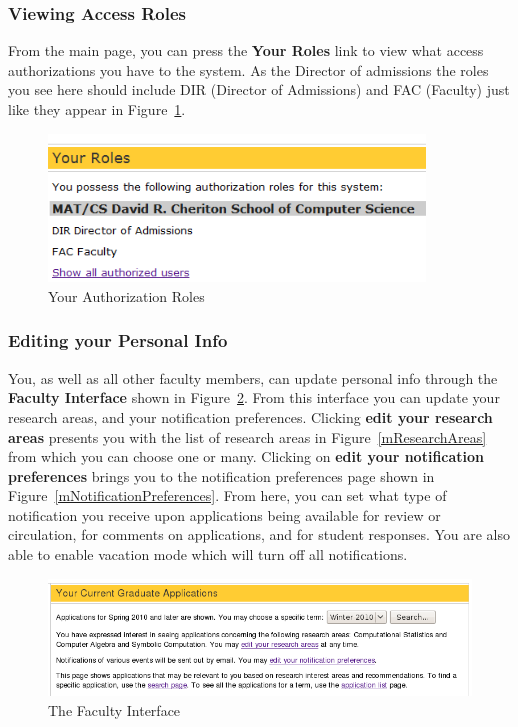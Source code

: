 \documentclass[titlepage]{article}
\begin{document}
\subsubsection{Viewing Access Roles}
From the main page, you can press the \textbf{\textsf{Your Roles}} link to view what
access authorizations you have to the system.  As the Director of admissions
the roles you see here should include DIR (Director of Admissions) and FAC
(Faculty) just like they appear in Figure~\ref{mYourRoles}.

\begin{figure}[h!]
  \begin{center}
  \includegraphics[width=10cm]{yourroles.png}
  \end{center}
  \caption{Your Authorization Roles}
  \label{mYourRoles}
\end{figure}

\subsubsection{Editing your Personal Info}
You, as well as all other faculty members, can update personal info through
the \textbf{\textsf{Faculty Interface}} shown in Figure~\ref{mFacultyInterface}.  From
this interface you can update your research areas, and your notification
preferences.  Clicking \textbf{\textsf{edit your research areas}} presents you with the
list of research areas in Figure~\ref{mResearchAreas} from which you can
choose one or many.  Clicking on \textbf{\textsf{edit your notification preferences}}
brings you to the notification preferences page shown in
Figure~\ref{mNotificationPreferences}.  From here, you can set what type of
notification you receive upon applications being available for review or
circulation, for comments on applications, and for student responses.  You are
also able to enable vacation mode which will turn off all notifications.

\begin{figure}[h!]
  \begin{center}
  \includegraphics[width=13cm]{facultyinterface.png}
  \end{center}
  \caption{The Faculty Interface}
  \label{mFacultyInterface}
\end{figure}
\end{document}
